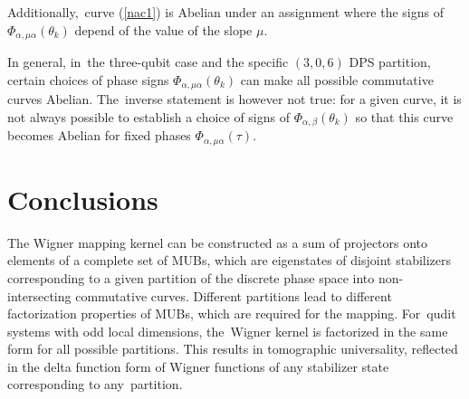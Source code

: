 \documentclass[quantumrep,article,accept,pdftex,moreauthors]{Definitions/mdpi}
\begin{document}
Additionally,~curve (\ref{nac1}) is Abelian under an assignment where the
signs of $\Phi_{\alpha,\mu \alpha}(\theta_{k})$ depend of the value of the slope
$\mu$.

In general, in~the three-qubit case and the specific $(3,0,6)$ DPS partition,
certain choices of phase signs $\Phi_{\alpha,\mu\alpha}(\theta_{k})$ can make
all possible commutative curves Abelian. The~inverse statement is however not
true: for a given curve, it is not always possible to establish a choice of
signs of $\Phi_{\alpha,\beta}(\theta_{k})$ so that this curve becomes Abelian
for fixed phases $\Phi_{\alpha,\mu \alpha}(\tau)$.


\section{Conclusions\label{sec:5}}

The Wigner mapping kernel can be constructed as a sum of projectors onto
elements of a complete set of MUBs, which are eigenstates of disjoint
stabilizers corresponding to a given partition of the discrete phase space into
non-intersecting commutative curves. Different partitions lead to different
factorization properties of MUBs, which are required for the mapping. For~qudit
systems with odd local dimensions, the~Wigner kernel is factorized in the same
form for all possible partitions. This results in tomographic universality,
reflected in the delta function form of Wigner functions of any stabilizer state
corresponding to any~partition.
\end{document}
